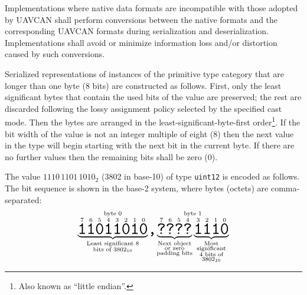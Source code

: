 Implementations where native data formats are incompatible with those adopted by UAVCAN shall perform
conversions between the native formats and the corresponding UAVCAN formats during
serialization and deserialization.
Implementations shall avoid or minimize information loss and/or distortion caused by such conversions.

Serialized representations of instances of the primitive type category that are longer than one byte (8 bits)
are constructed as follows.
First, only the least significant bytes that contain the used bits of the value are preserved;
the rest are discarded following the lossy assignment policy selected by the specified cast mode.
Then the bytes are arranged in the least-significant-byte-first order\footnote{Also known as ``little endian''.}.
If the bit width of the value is not an integer multiple of eight (8) then the next value in the type will begin
starting with the next bit in the current byte. If there are no further values then the remaining bits
shall be zero (0).

\begin{remark}
    The value $1110\,1101\,1010_2$ (3802 in base-10) of type \verb|uint12| is encoded as follows.
    The bit sequence is shown in the base-2 system, where bytes (octets) are comma-separated:
    $$
        \overset{\text{byte 0}}{%
            \underbrace{%
                \overset{7}{\hugett{1}}
                \overset{6}{\hugett{1}}
                \overset{5}{\hugett{0}}
                \overset{4}{\hugett{1}}
                \overset{3}{\hugett{1}}
                \overset{2}{\hugett{0}}
                \overset{1}{\hugett{1}}
                \overset{0}{\hugett{0}}
            }_{\substack{\text{Least significant 8} \\ \text{bits of }3802_{10}}}%
        }%
        \hugett{,}%
        \overset{\text{byte 1}}{%
            \underbrace{
                \overset{7}{\hugett{?}}
                \overset{6}{\hugett{?}}
                \overset{5}{\hugett{?}}
                \overset{4}{\hugett{?}}
            }_{\substack{\text{Next object} \\ \text{or zero} \\ \text{padding bits}}}%
            \underbrace{ 
                \overset{3}{\hugett{1}}
                \overset{2}{\hugett{1}}
                \overset{1}{\hugett{1}}
                \overset{0}{\hugett{0}}
            }_{\substack{\text{Most} \\ \text{significant} \\ \text{4 bits of} \\ \text{3802}_{10}}}%
        }
    $$
\end{remark}

